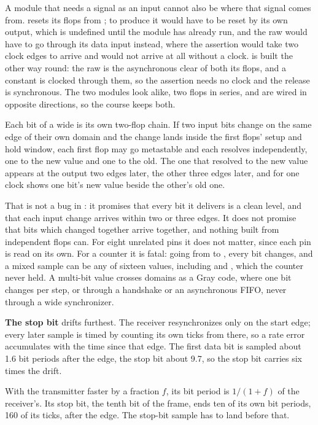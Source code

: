  A module that needs a signal as an input cannot also be where that signal comes from.
 resets its flops from ; to produce  it would have to
be reset by its own output, which is undefined until the module has already run, and the raw
 would have to go through its data input instead, where the assertion would take two
clock edges to arrive and would not arrive at all without a clock.  is built the
other way round: the raw  is the asynchronous clear of both its flops, and a constant
 is clocked through them, so the assertion needs no clock and the release is synchronous.
The two modules look alike, two flops in series, and are wired in opposite directions, so the course
keeps both.

 Each bit of a wide  is its own two-flop chain. If two input bits change on the same
edge of their own domain and the change lands inside the first flops' setup and hold window, each
first flop may go metastable and each resolves independently, one to the new value and one to the
old. The one that resolved to the new value appears at the output two edges later, the other three
edges later, and for one clock  shows one bit's new value beside the other's old one.

That is not a bug in : it promises that every bit it delivers is a clean level, and that
each input change arrives within two or three edges. It does not promise that bits which changed
together arrive together, and nothing built from independent flops can. For eight unrelated pins it
does not matter, since each pin is read on its own. For a counter it is fatal: going from
 to , every bit changes, and a mixed sample can be any of sixteen values,
including  and , which the counter never held. A multi-bit value crosses
domains as a Gray code, where one bit changes per step, or through a handshake or an asynchronous
FIFO, never through a wide synchronizer.

 \textbf{The stop bit} drifts furthest. The receiver resynchronizes only on the start edge; every
later sample is timed by counting its own ticks from there, so a rate error accumulates with the
time since that edge. The first data bit is sampled about 1.6 bit periods after the edge, the stop
bit about 9.7, so the stop bit carries six times the drift.

With the transmitter faster by a fraction $f$, its bit period is $1/(1+f)$ of the receiver's. Its
stop bit, the tenth bit of the frame, ends ten of its own bit periods, 160 of its ticks, after the
edge. The stop-bit sample has to land before that.

